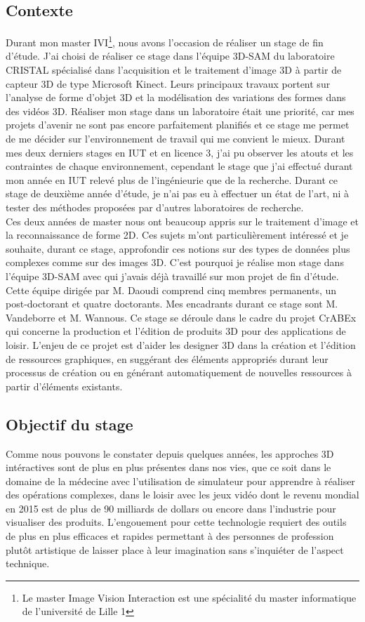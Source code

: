 \subsection{Contexte}
Durant mon master IVI\footnote{Le master Image Vision Interaction est 
une spécialité du master informatique de l'université de Lille 1}, 
nous avons l'occasion de réaliser un stage de fin d'étude. J'ai choisi de réaliser ce stage
dans l'équipe 3D-SAM du laboratoire CRISTAL spécialisé dans l'acquisition et le traitement d'image 3D 
à partir de capteur 3D de type Microsoft Kinect. Leurs principaux travaux portent sur
l'analyse de forme d'objet 3D et la modélisation des variations des formes dans des
vidéos 3D. Réaliser mon stage dans un laboratoire était une priorité, car mes projets d'avenir
ne sont pas encore parfaitement planifiés et ce stage me permet de me décider sur l'environnement
de travail qui me convient le mieux. Durant mes deux derniers stages en IUT et en licence 3, j'ai pu
observer les atouts et les contraintes de chaque environnement, cependant le stage que j'ai effectué 
durant mon année en IUT relevé plus de l'ingénieurie que de la recherche. Durant ce stage de deuxième
année d'étude, je n'ai pas eu à effectuer un état de l'art, ni à tester des méthodes proposées par 
d'autres laboratoires de recherche.\\

Ces deux années de master nous ont beaucoup appris sur le traitement d'image et la reconnaissance de 
forme 2D. Ces sujets m'ont particulièrement intéressé et je souhaite, durant ce stage, approfondir ces
notions sur des types de données plus complexes comme sur des images 3D. C'est pourquoi je réalise mon
stage dans l'équipe 3D-SAM avec qui j'avais déjà travaillé sur mon projet de fin d'étude. Cette équipe
dirigée par M. Daoudi comprend cinq membres permanents, un post-doctorant et quatre doctorants. Mes 
encadrants durant ce stage sont M. Vandeborre et M. Wannous. Ce stage se déroule dans le cadre du
projet CrABEx qui concerne la production et l'édition de produits 3D pour des applications de
loisir. L'enjeu de ce projet est d'aider les designer 3D dans la création et l'édition de ressources
graphiques, en suggérant des éléments appropriés durant leur processus de création ou en générant automatiquement 
de nouvelles ressources à partir d'éléments existants.

\subsection{Objectif du stage}
Comme nous pouvons le constater depuis quelques années, les approches 3D intéractives sont de plus en plus 
présentes dans nos vies, que ce soit dans le domaine de la médecine avec l'utilisation de simulateur
pour apprendre à réaliser des opérations complexes, dans le loisir avec les jeux vidéo dont le revenu
mondial en 2015 est de plus de 90 milliards de dollars ou encore dans l'industrie pour visualiser des produits.
L'engouement pour cette technologie requiert des outils de plus en plus efficaces et rapides permettant à
des personnes de profession plutôt artistique de laisser place à leur imagination sans s'inquiéter de 
l'aspect technique.\\

